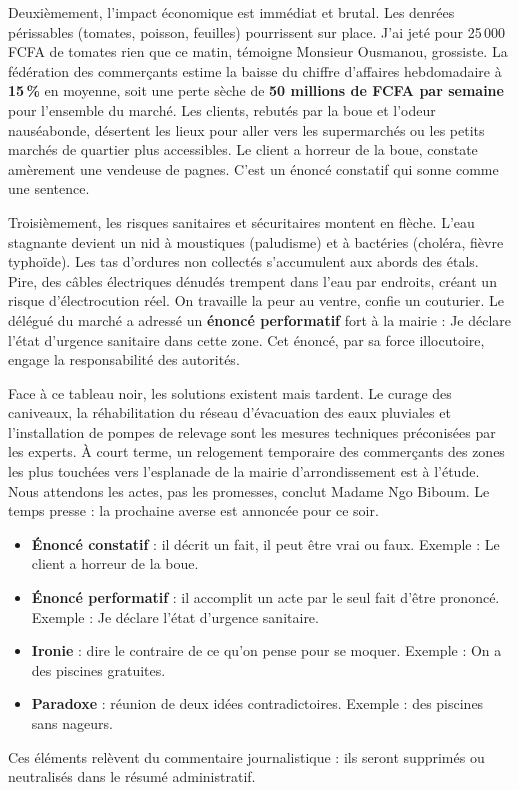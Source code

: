 \documentclass[11pt]{article}
\begin{document}
Deuxièmement, l'impact économique est immédiat et brutal. Les denrées périssables (tomates, poisson, feuilles) pourrissent sur place. \og{}J'ai jeté pour 25\,000 FCFA de tomates rien que ce matin\fg{}, témoigne Monsieur Ousmanou, grossiste. La fédération des commerçants estime la baisse du chiffre d'affaires hebdomadaire à \textbf{15\,\%} en moyenne, soit une perte sèche de \textbf{50 millions de FCFA par semaine} pour l'ensemble du marché. Les clients, rebutés par la boue et l'odeur nauséabonde, désertent les lieux pour aller vers les supermarchés ou les petits marchés de quartier plus accessibles. \og{}Le client a horreur de la boue\fg{}, constate amèrement une vendeuse de pagnes. C'est un énoncé constatif qui sonne comme une sentence.

Troisièmement, les risques sanitaires et sécuritaires montent en flèche. L'eau stagnante devient un nid à moustiques (paludisme) et à bactéries (choléra, fièvre typhoïde). Les tas d'ordures non collectés s'accumulent aux abords des étals. Pire, des câbles électriques dénudés trempent dans l'eau par endroits, créant un risque d'électrocution réel. \og{}On travaille la peur au ventre\fg{}, confie un couturier. Le délégué du marché a adressé un \textbf{énoncé performatif} fort à la mairie : \og{}Je déclare l'état d'urgence sanitaire dans cette zone\fg{}. Cet énoncé, par sa force illocutoire, engage la responsabilité des autorités.

Face à ce tableau noir, les solutions existent mais tardent. Le curage des caniveaux, la réhabilitation du réseau d'évacuation des eaux pluviales et l'installation de pompes de relevage sont les mesures techniques préconisées par les experts. À court terme, un relogement temporaire des commerçants des zones les plus touchées vers l'esplanade de la mairie d'arrondissement est à l'étude. \og{}Nous attendons les actes, pas les promesses\fg{}, conclut Madame Ngo Biboum. Le temps presse : la prochaine averse est annoncée pour ce soir.

\begin{attention}
\begin{itemize}
    \item \textbf{Énoncé constatif} : il décrit un fait, il peut être vrai ou faux. Exemple : \og{}Le client a horreur de la boue\fg{}.
    \item \textbf{Énoncé performatif} : il accomplit un acte par le seul fait d'être prononcé. Exemple : \og{}Je déclare l'état d'urgence sanitaire\fg{}.
    \item \textbf{Ironie} : dire le contraire de ce qu'on pense pour se moquer. Exemple : \og{}On a des piscines gratuites\fg{}.
    \item \textbf{Paradoxe} : réunion de deux idées contradictoires. Exemple : \og{}des piscines sans nageurs\fg{}.
\end{itemize}
Ces éléments relèvent du commentaire journalistique : ils seront supprimés ou neutralisés dans le résumé administratif.
\end{attention}
\end{document}
